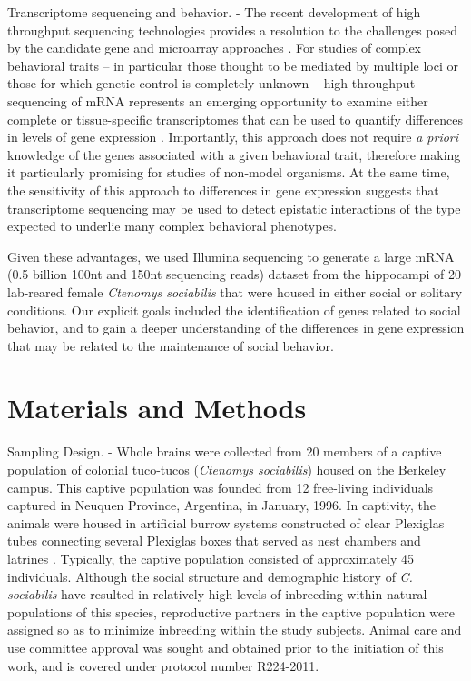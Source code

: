 \documentclass[10.5pt]{article}
\begin{document}
Transcriptome sequencing and behavior. - The recent development of high throughput sequencing technologies provides a resolution to the challenges posed by the candidate gene and microarray approaches \citep{Metzker:2010ew, Myles:2010in}.  For studies of complex behavioral traits -- in particular those thought to be mediated by multiple loci or those for which genetic control is completely unknown -- high-throughput sequencing of mRNA represents an emerging opportunity to examine either complete or tissue-specific transcriptomes \citep{VegaArreguin:2009jj, Whittington:2009bn} that can be used to quantify differences in levels of gene expression \citep{Mortazavi:2008jj}. Importantly, this approach does not require \textit{a priori} knowledge of the genes associated with a given behavioral trait, therefore making it particularly promising for studies of non-model organisms. At the same time, the sensitivity of this approach to differences in gene expression suggests that transcriptome sequencing may be used to detect epistatic interactions of the type expected to underlie many complex behavioral phenotypes.  

Given these advantages, we used Illumina sequencing to generate a large mRNA (0.5 billion 100nt and 150nt sequencing reads) dataset from the hippocampi of 20 lab-reared female \textit{Ctenomys sociabilis} that were housed in either social or solitary conditions. Our explicit goals included the identification of genes related to social behavior, and to gain a deeper understanding of the differences in gene expression that may be related to the maintenance of social behavior. 

\section*{Materials and Methods}
\hspace{4mm} Sampling Design. - Whole brains were collected from 20 members of a captive population of colonial tuco-tucos (\textit{Ctenomys sociabilis}) housed on the Berkeley campus. This captive population was founded from 12 free-living individuals captured in Neuquen Province, Argentina, in January, 1996. In captivity, the animals were housed in artificial burrow systems constructed of clear Plexiglas tubes connecting several Plexiglas boxes that served as nest chambers and latrines \citep{Woodruff:2010fc}. Typically, the captive population consisted of approximately 45 individuals. Although the social structure and demographic history of \textit{C. sociabilis} \citep{Chan:2005gj} have resulted in relatively high levels of inbreeding within natural populations of this species, reproductive partners in the captive population were assigned so as to minimize inbreeding within the study subjects.  Animal care and use committee approval was sought and obtained prior to the initiation of this work, and is covered under protocol number R224-2011. 
\end{document}
